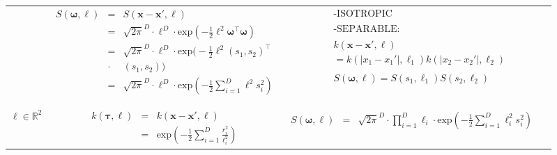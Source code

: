 \documentclass[onecolumn,a4paper,11pt]{article}
\begin{document}
\begin{landscape}
\begin{table}[H]
\begin{center}
\begin{tabular}{|c|c|c|c|}
       & \multicolumn{1}{|p{8.2cm}|}{
         \begin{eqnarray*}
		S(\bm{\omega},\ell) &=& S(\bm{x}-\bm{x}',\ell)\\
		&=& \sqrt{2\pi}^D \cdot \ell^D \cdot \mathrm{exp}\left(-\frac{1}{2} \ell^2 \bm{\omega}^\top\bm{\omega} \right) \\
		&=& \sqrt{2\pi}^D \cdot \ell^D \cdot \mathrm{exp}\Big(-\frac{1}{2} \ell^2 (s_1, s_2)^\top\\
		&\cdot& (s_1, s_2) \Big) \\
		&=& \sqrt{2\pi}^D \cdot \ell^D \cdot \mathrm{exp}\left(-\frac{1}{2} \sum_{i=1}^{D}\ell^2 s_i^2 \right) \\
         \end{eqnarray*}
       }
       
       & \multicolumn{1}{|p{6.2cm}|}{
         \begin{eqnarray*}
        &&\text{-ISOTROPIC}\\
        \\
		&&\text{-SEPARABLE:} \\
		\\
		&&k(\bm{x}-\bm{x}',\bm{\ell})\\
		 &&= k(|x_1-x_1'|,\ell_1)k(|x_2-x_2'|,\ell_2)\\
		 \\
		&&S(\bm{\omega},\bm{\ell})= S(s_1,\ell_1)S(s_2,\ell_2)
         \end{eqnarray*}
       } \\
       \vspace{-15mm}\\
       \cline{1-3}
       
       \multicolumn{1}{|p{1.5cm}|}{
       \vspace{1mm}
       $\bm{\ell} \in \mathbb{R}^2$
       }
       
         & \multicolumn{1}{|p{7.2cm}|}{
         \begin{eqnarray*}
		k(\bm{\tau},\bm{\ell}) &=& k(\bm{x}-\bm{x}',\bm{\ell})\\
		&=& \mathrm{exp}\left(-\frac{1}{2} \sum_{i=1}^{D}\frac{r_i^2}{\ell_i^2} \right)
         \end{eqnarray*}
       }
       
       & \multicolumn{1}{|p{8.2cm}|}{
         \begin{eqnarray*}
		S(\bm{\omega},\ell) &=& \sqrt{2\pi}^D \cdot \prod_{i=1}^D \ell_i \cdot \mathrm{exp}\left(-\frac{1}{2} \sum_{i=1}^D \ell_i^2 s_i^2 \right)
         \end{eqnarray*}
       }
       

\end{tabular}
\end{center}
\end{table}
\end{landscape}
\end{document}
